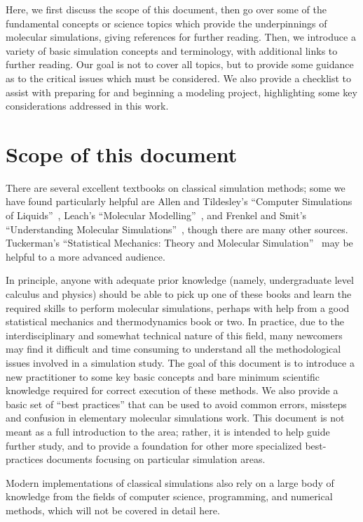 \documentclass[9pt,bestpractices]{livecoms}
\begin{document}
Here, we first discuss the scope of this document, then go over some of the fundamental concepts or science topics which provide the underpinnings of molecular simulations, giving references for further reading.
Then, we introduce a variety of basic simulation concepts and terminology, with additional links to further reading.
Our goal is not to cover all topics, but to provide some guidance as to the critical issues which must be considered.
We also provide a checklist to assist with preparing for and beginning a modeling project, highlighting some key considerations addressed in this work.

\section{Scope of this document}
\label{sec:scope}

There are several excellent textbooks on classical simulation methods; some we have found particularly helpful are Allen and Tildesley's ``Computer Simulations of Liquids''~\cite{allen_computer_2017}, Leach's ``Molecular Modelling''~\cite{LeachBook}, and Frenkel and Smit's ``Understanding Molecular Simulations''~\cite{Frenkel:2001:}, though there are many other sources.
Tuckerman's ``Statistical Mechanics: Theory and Molecular Simulation''~\cite{Tuckerman:2010:} may be helpful to a more advanced audience.

In principle, anyone with adequate prior knowledge (namely, undergraduate level calculus and physics) should be able to pick up one of these books and learn the required skills to perform molecular simulations, perhaps with help from a good statistical mechanics and thermodynamics book or two.
In practice, due to the interdisciplinary and somewhat technical nature of this field, many newcomers may find it difficult and time consuming to understand all the methodological issues involved in a simulation study.  
The goal of this document is to introduce a new practitioner to some key basic concepts and bare minimum scientific knowledge required for correct execution of these methods. 
We also provide a basic set of ``best practices'' that can be used to avoid common errors, missteps and confusion in elementary molecular simulations work.
This document is not meant as a full introduction to the area; rather, it is intended to help guide further study, and to provide a foundation for other more specialized best-practices documents focusing on particular simulation areas.

Modern implementations of classical simulations also rely on a large body of knowledge from the fields of computer science, programming, and numerical methods, which will not be covered in detail here.
\end{document}
